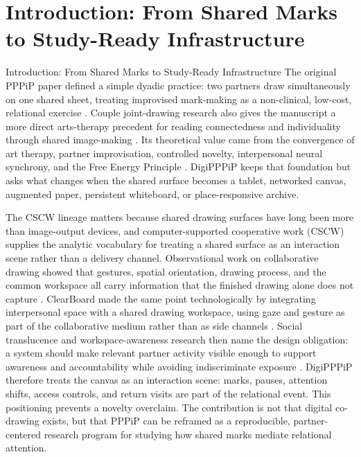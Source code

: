 \documentclass[
  ignorenonframetext,
]{beamer}
\author{\texorpdfstring{}{}}
\date{}
\begin{document}
\section{Introduction: From Shared Marks to Study-Ready
Infrastructure}\label{sec:introduction}

\begin{frame}{Introduction: From Shared Marks
to Study-Ready Infrastructure}
The original PPPiP paper defined a simple dyadic practice: two partners
draw simultaneously on one shared sheet, treating improvised mark-making
as a non-clinical, low-cost, relational exercise
. Couple joint-drawing research also gives the
manuscript a more direct arts-therapy precedent for reading
connectedness and individuality through shared image-making
. Its theoretical value came from the convergence of
art therapy, partner improvisation, controlled novelty, interpersonal
neural synchrony, and the Free Energy Principle .
DigiPPPiP keeps that foundation but asks what changes when the shared
surface becomes a tablet, networked canvas, augmented paper, persistent
whiteboard, or place-responsive archive.

The CSCW lineage matters because shared drawing surfaces have long been
more than image-output devices, and computer-supported cooperative work
(CSCW) supplies the analytic vocabulary for treating a shared surface as
an interaction scene rather than a delivery channel. Observational work
on collaborative drawing showed that gestures, spatial orientation,
drawing process, and the common workspace all carry information that the
finished drawing alone does not capture
. ClearBoard made the same point
technologically by integrating interpersonal space with a shared drawing
workspace, using gaze and gesture as part of the collaborative medium
rather than as side channels . Social
translucence and workspace-awareness research then name the design
obligation: a system should make relevant partner activity visible
enough to support awareness and accountability while avoiding
indiscriminate exposure . DigiPPPiP therefore treats the canvas
as an interaction scene: marks, pauses, attention shifts, access
controls, and return visits are part of the relational event. This
positioning prevents a novelty overclaim. The contribution is not that
digital co-drawing exists, but that PPPiP can be reframed as a
reproducible, partner-centered research program for studying how shared
marks mediate relational attention.


\end{frame}
\end{document}
